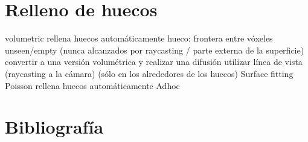 \documentclass{pfc}
\begin{document}
	\section{Relleno de huecos}
		volumetric rellena huecos automáticamente
			hueco: frontera entre vóxeles unseen/empty (nunca alcanzados por raycasting / parte externa de la superficie)
			convertir a una versión volumétrica y realizar una difusión
				utilizar línea de vista (raycasting a la cámara)
				(sólo en los alrededores de los huecos)
		Surface fitting
		Poisson rellena huecos automáticamente
		Adhoc

\section{Bibliografía}
\end{document}
